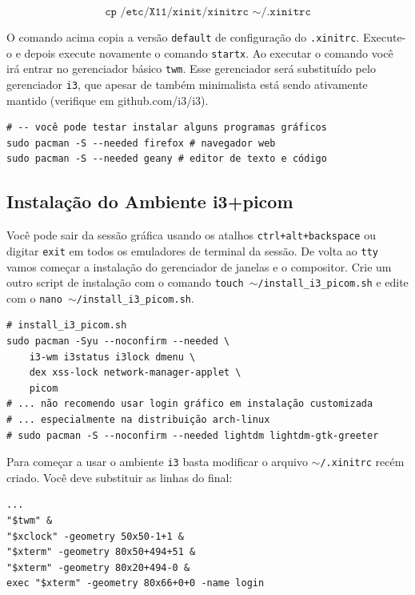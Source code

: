 \documentclass[12pt,a4paper]{article}
\begin{document}
$$ \texttt{cp /etc/X11/xinit/xinitrc $\sim$/.xinitrc} $$

O comando acima copia a versão \texttt{default} de configuração do \texttt{.xinitrc}. Execute-o e depois execute novamente o comando \texttt{startx}. Ao executar o comando você irá entrar no gerenciador básico \texttt{twm}. Esse gerenciador será substituído pelo gerenciador \texttt{i3}, que apesar de também minimalista está sendo ativamente mantido (verifique em github.com/i3/i3).\\

\begin{lstlisting}
# -- você pode testar instalar alguns programas gráficos
sudo pacman -S --needed firefox # navegador web
sudo pacman -S --needed geany # editor de texto e código
\end{lstlisting}

\subsection{Instalação do Ambiente i3+picom}

\hspace{\baselineskip}

Você pode sair da sessão gráfica usando os atalhos \texttt{ctrl+alt+backspace} ou digitar \texttt{exit} em todos os emuladores de terminal da sessão. De volta ao \texttt{tty} vamos começar a instalação do gerenciador de janelas e o compositor. Crie um outro script de instalação com o comando \texttt{touch $\sim$/install\_i3\_picom.sh} e edite com o \texttt{nano $\sim$/install\_i3\_picom.sh}.\\

\begin{lstlisting}
# install_i3_picom.sh
sudo pacman -Syu --noconfirm --needed \
    i3-wm i3status i3lock dmenu \
    dex xss-lock network-manager-applet \
    picom
# ... não recomendo usar login gráfico em instalação customizada
# ... especialmente na distribuição arch-linux 
# sudo pacman -S --noconfirm --needed lightdm lightdm-gtk-greeter
\end{lstlisting}

\vspace{\baselineskip}

Para começar a usar o ambiente \texttt{i3} basta modificar o arquivo \texttt{$\sim$/.xinitrc} recém criado. Você deve substituir as linhas do final:

\begin{lstlisting}
...
"$twm" &
"$xclock" -geometry 50x50-1+1 &
"$xterm" -geometry 80x50+494+51 &
"$xterm" -geometry 80x20+494-0 &
exec "$xterm" -geometry 80x66+0+0 -name login
\end{lstlisting}
\end{document}
